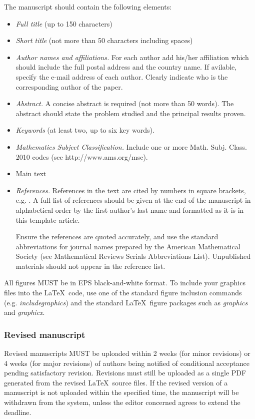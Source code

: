 \documentclass{mc}
\begin{document}
The manuscript should contain the following elements:
\begin{itemize}
\item {\em Full title} (up to 150 characters)
\item {\em Short title} (not more than 50 characters including spaces)
\item {\em Author names and affiliations.} For each author add his/her affiliation which should include the full postal address and the country name. If avilable, specify the e-mail address of each author. Clearly indicate who is the corresponding author of the paper.
\item {\em Abstract.} A concise abstract is required (not more than 50 words). The abstract should state the problem studied and the principal results proven.
\item {\em Keywords} (at least two, up to six key words).
\item {\em Mathematics Subject Classification.} Include one or more Math. Subj. Class. 2010 codes (see http://www.ams.org/msc).
\item Main text
\item {\em References.} References in the text are cited by numbers in square brackets, e.g. \cite{Boggs1987}. A full list of references should be given at the end of the manuscript in alphabetical order by the first author's last name and formatted as it is in this template article.

Ensure the references are quoted accurately, and use the standard abbreviations for journal names prepared by the American Mathematical Society (see Mathematical Reviews Serials Abbreviations List). Unpublished materials should not appear in the reference list.
\end{itemize}

All figures MUST be in EPS black-and-white format. To include your graphics files into the \LaTeX\ code, use one of the standard figure inclusion commands (e.g. {\em includegraphics}) and the standard \LaTeX\ figure packages such as {\em graphics} and {\em graphicx}.

\subsubsection{Revised manuscript}
 Revised manuscripts MUST be uploaded within 2 weeks (for minor revisions) or 4 weeks (for major revisions) of authors being notified of conditional acceptance pending satisfactory revision. Revisions must still be uploaded as a single PDF generated from the revised \LaTeX\ source files. If the revised version of a manuscript is not uploaded within the specified time, the manuscript will be withdrawn from the system, unless the editor concerned agrees to extend the deadline.
\end{document}
